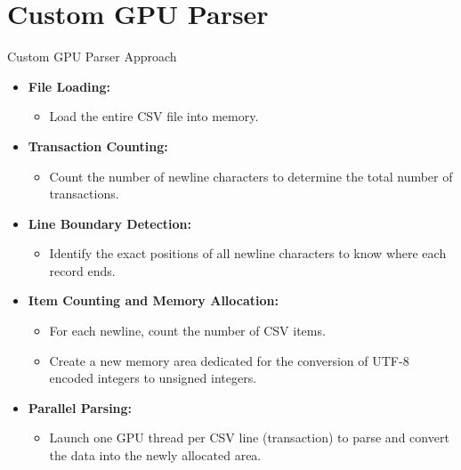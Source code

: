 \documentclass{beamer}
\begin{document}
\section{Custom GPU Parser}
\begin{frame}{Custom GPU Parser Approach}
  \begin{itemize}
    \item \textbf{File Loading:}  
      \begin{itemize}
        \item Load the entire CSV file into memory.
      \end{itemize}
    \item \textbf{Transaction Counting:}
      \begin{itemize}
        \item Count the number of newline characters to determine the total number of transactions.
      \end{itemize}
    \item \textbf{Line Boundary Detection:}
      \begin{itemize}
        \item Identify the exact positions of all newline characters to know where each record ends.
      \end{itemize}
    \item \textbf{Item Counting and Memory Allocation:}
      \begin{itemize}
        \item For each newline, count the number of CSV items.
        \item Create a new memory area dedicated for the conversion of UTF-8 encoded integers to unsigned integers.
      \end{itemize}
    \item \textbf{Parallel Parsing:}
      \begin{itemize}
        \item Launch one GPU thread per CSV line (transaction) to parse and convert the data into the newly allocated area.
      \end{itemize}
  \end{itemize}

\end{frame}
\end{document}
